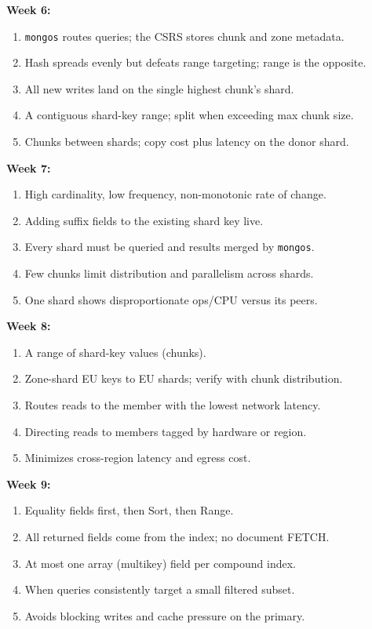 \documentclass[11pt, a4paper]{article}
\begin{document}
\textbf{Week 6:}
\begin{enumerate}[itemsep=0pt]
    \item \texttt{mongos} routes queries; the CSRS stores chunk and zone metadata.
    \item Hash spreads evenly but defeats range targeting; range is the opposite.
    \item All new writes land on the single highest chunk's shard.
    \item A contiguous shard-key range; split when exceeding max chunk size.
    \item Chunks between shards; copy cost plus latency on the donor shard.
\end{enumerate}

\textbf{Week 7:}
\begin{enumerate}[itemsep=0pt]
    \item High cardinality, low frequency, non-monotonic rate of change.
    \item Adding suffix fields to the existing shard key live.
    \item Every shard must be queried and results merged by \texttt{mongos}.
    \item Few chunks limit distribution and parallelism across shards.
    \item One shard shows disproportionate ops/CPU versus its peers.
\end{enumerate}

\textbf{Week 8:}
\begin{enumerate}[itemsep=0pt]
    \item A range of shard-key values (chunks).
    \item Zone-shard EU keys to EU shards; verify with chunk distribution.
    \item Routes reads to the member with the lowest network latency.
    \item Directing reads to members tagged by hardware or region.
    \item Minimizes cross-region latency and egress cost.
\end{enumerate}

\textbf{Week 9:}
\begin{enumerate}[itemsep=0pt]
    \item Equality fields first, then Sort, then Range.
    \item All returned fields come from the index; no document FETCH.
    \item At most one array (multikey) field per compound index.
    \item When queries consistently target a small filtered subset.
    \item Avoids blocking writes and cache pressure on the primary.
\end{enumerate}
\end{document}
